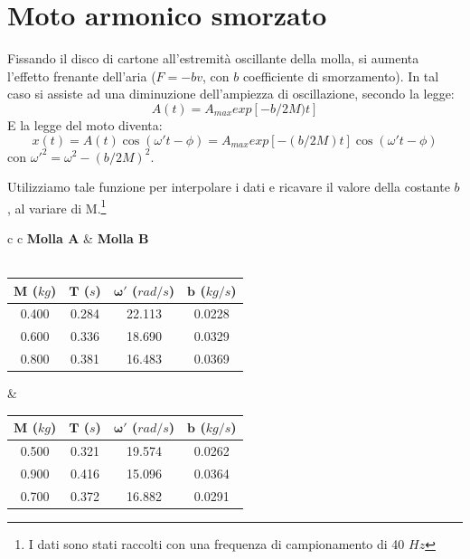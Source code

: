 \section{Moto armonico smorzato}

Fissando il disco di cartone all'estremità oscillante della molla, si aumenta l'effetto frenante dell'aria ($F=-bv$, con $b$ coefficiente di smorzamento).  
In tal caso si assiste ad una diminuzione dell'ampiezza di oscillazione, secondo la legge:
\begin{equation}\label{Asm}
A(t)=A_{max}exp[-b/2M)t]
\end{equation}
E la legge del moto diventa:
\begin{equation}
x(t)=A(t)\cos(\omega't-\phi)=A_{max}exp[-(b/2M)t]\cos(\omega't-\phi)
\end{equation}
con $\omega'^2=\omega^2-(b/2M)^2$.

Utilizziamo tale funzione per interpolare i dati e ricavare il valore della costante $b$, al variare di M.\footnote{I dati sono stati raccolti con una frequenza di campionamento di 40 $Hz$}
\begin{center}

\begin{tabular}{c c}
\textbf{Molla A} & \hspace{1cm} \textbf{Molla B}\\
\\
\begin{tabular}{c | c | c | c}
$\boldsymbol{M}$ ($kg$) & $\boldsymbol{T}$ ($s$) & $\boldsymbol{\omega'}$ ($rad/s$) & $\boldsymbol{b}$ ($kg/s$)\\
\midrule
0.400 & 0.284 & 22.113 & 0.0228\\
0.600 & 0.336 & 18.690 & 0.0329\\
0.800 & 0.381 & 16.483 & 0.0369\\
\end{tabular}

& \hspace{1cm}

\begin{tabular}{c | c | c | c}
$\boldsymbol{M}$ ($kg$) & $\boldsymbol{T}$ ($s$) & $\boldsymbol{\omega'}$ ($rad/s$) & $\boldsymbol{b}$ ($kg/s$)\\
\midrule
0.500 & 0.321 & 19.574 & 0.0262\\
0.900 & 0.416 & 15.096 & 0.0364\\
0.700 & 0.372 & 16.882 & 0.0291\\
\end{tabular}

\end{tabular}

\end{center}

